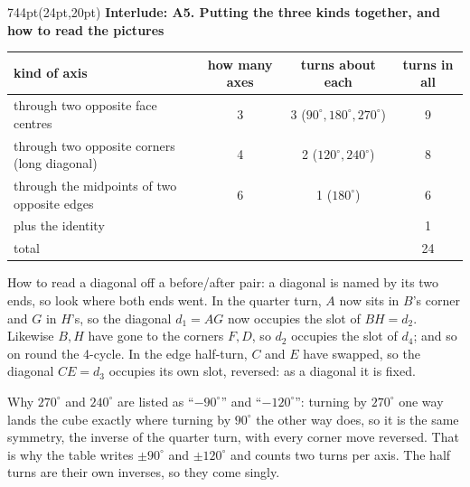 \documentclass[10pt]{article}
\newcommand{\interlude}[2]{%
  \begin{textblock*}{744pt}(24pt,20pt)
    {\sffamily\bfseries\large\color{big} Interlude: #1}\par\vspace{4pt}
    \small #2\end{textblock*}\mbox{}\clearpage}
\begin{document}
\interlude{A5. Putting the three kinds together, and how to read the pictures}{
\begin{minipage}[t]{744pt}\vspace{0pt}
\small
\begin{center}
\begin{tabular}{@{}lccc@{}}
\toprule
kind of axis & how many axes & turns about each & turns in all\\
\midrule
through two opposite face centres & 3 & 3 ($90^\circ,180^\circ,270^\circ$) & 9\\
through two opposite corners (long diagonal) & 4 & 2 ($120^\circ,240^\circ$) & 8\\
through the midpoints of two opposite edges & 6 & 1 ($180^\circ$) & 6\\
\midrule
plus the identity & & & 1\\
total & & & 24\\
\bottomrule
\end{tabular}
\end{center}
\vspace{8pt}
\begin{minipage}[t]{360pt}\vspace{0pt}\raggedright
\begin{why}
How to read a diagonal off a before/after pair: a diagonal is named by its two ends, so look where both ends went. In the quarter turn, $A$ now sits in $B$'s corner and $G$ in $H$'s, so the diagonal $d_1=AG$ now occupies the slot of $BH=d_2$. Likewise $B,H$ have gone to the corners $F,D$, so $d_2$ occupies the slot of $d_4$; and so on round the 4-cycle. In the edge half-turn, $C$ and $E$ have swapped, so the diagonal $CE=d_3$ occupies its own slot, reversed: as a diagonal it is fixed.
\end{why}
\begin{why}
Why $270^\circ$ and $240^\circ$ are listed as ``$-90^\circ$'' and ``$-120^\circ$'': turning by $270^\circ$ one way lands the cube exactly where turning by $90^\circ$ the other way does, so it is the same symmetry, the inverse of the quarter turn, with every corner move reversed. That is why the table writes $\pm90^\circ$ and $\pm120^\circ$ and counts two turns per axis. The half turns are their own inverses, so they come singly.
\end{why}
\end{minipage}\hfill
\begin{minipage}[t]{360pt}\vspace{0pt}\raggedright

\end{minipage}
\end{minipage}}
\end{document}
